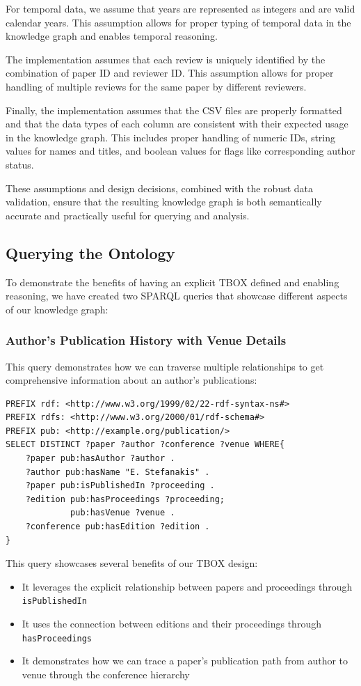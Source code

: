 \documentclass[10pt,a4paper]{article}
\begin{document}
For temporal data, we assume that years are represented as integers and are valid calendar years. This assumption allows for proper typing of temporal data in the knowledge graph and enables temporal reasoning.

The implementation assumes that each review is uniquely identified by the combination of paper ID and reviewer ID. This assumption allows for proper handling of multiple reviews for the same paper by different reviewers.

Finally, the implementation assumes that the CSV files are properly formatted and that the data types of each column are consistent with their expected usage in the knowledge graph. This includes proper handling of numeric IDs, string values for names and titles, and boolean values for flags like corresponding author status.

These assumptions and design decisions, combined with the robust data validation, ensure that the resulting knowledge graph is both semantically accurate and practically useful for querying and analysis.

\subsection{Querying the Ontology}

To demonstrate the benefits of having an explicit TBOX defined and enabling reasoning, we have created two SPARQL queries that showcase different aspects of our knowledge graph:

\subsubsection{Author's Publication History with Venue Details}
This query demonstrates how we can traverse multiple relationships to get comprehensive information about an author's publications:

\begin{verbatim}
PREFIX rdf: <http://www.w3.org/1999/02/22-rdf-syntax-ns#>
PREFIX rdfs: <http://www.w3.org/2000/01/rdf-schema#>
PREFIX pub: <http://example.org/publication/>
SELECT DISTINCT ?paper ?author ?conference ?venue WHERE{
    ?paper pub:hasAuthor ?author .
    ?author pub:hasName "E. Stefanakis" .
    ?paper pub:isPublishedIn ?proceeding .
    ?edition pub:hasProceedings ?proceeding;
             pub:hasVenue ?venue .
    ?conference pub:hasEdition ?edition .
}
\end{verbatim}

This query showcases several benefits of our TBOX design:
\begin{itemize}
    \item It leverages the explicit relationship between papers and proceedings through \texttt{isPublishedIn}
    \item It uses the connection between editions and their proceedings through \texttt{hasProceedings}
    \item It demonstrates how we can trace a paper's publication path from author to venue through the conference hierarchy
\end{itemize}
\end{document}

